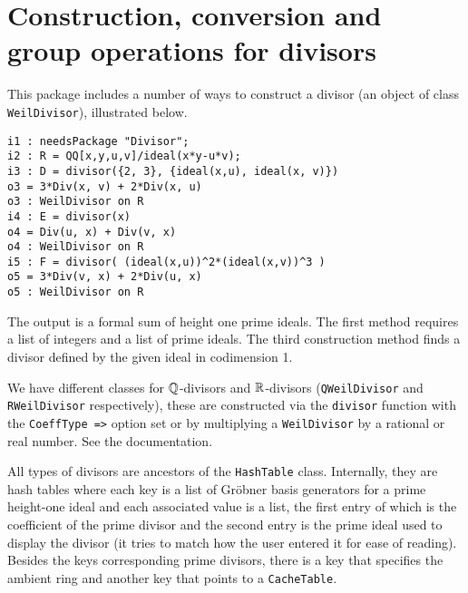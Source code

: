 \documentclass[11pt]{amsart}
\begin{document}
\section{Construction, conversion and group operations for divisors}
\label{sec.Construction}
This package includes a number of ways to construct a divisor (an object of class {\tt WeilDivisor}), illustrated below.
\begin{verbatim}
i1 : needsPackage "Divisor";
i2 : R = QQ[x,y,u,v]/ideal(x*y-u*v);
i3 : D = divisor({2, 3}, {ideal(x,u), ideal(x, v)})
o3 = 3*Div(x, v) + 2*Div(x, u)
o3 : WeilDivisor on R
i4 : E = divisor(x)
o4 = Div(u, x) + Div(v, x)
o4 : WeilDivisor on R
i5 : F = divisor( (ideal(x,u))^2*(ideal(x,v))^3 )
o5 = 3*Div(v, x) + 2*Div(u, x)
o5 : WeilDivisor on R
\end{verbatim}
The output is a formal sum of height one prime ideals.  The first method requires a list of integers and a list of prime ideals.  The third construction method finds a divisor defined by the given ideal in codimension 1.

We have different classes for $\mathbb{Q}$-divisors and $\mathbb{R}$-divisors ({\tt QWeilDivisor} and {\tt RWeilDivisor} respectively), these are constructed via the {\tt divisor} function with the {\tt CoeffType =>} option set or by multiplying a {\tt WeilDivisor} by a rational or real number.  See the documentation.

All types of divisors are ancestors of the {\tt HashTable} class.  Internally, they are hash tables where each key is a list of Gr\"obner basis generators for a prime height-one ideal and each associated value is a list, the first entry of which is the coefficient of the prime divisor and the second entry is the prime ideal used to display the divisor (it tries to match how the user entered it for ease of reading).  Besides the keys corresponding prime divisors, there is a key that specifies the ambient ring and another key that points to a {\tt CacheTable}.
\end{document}
